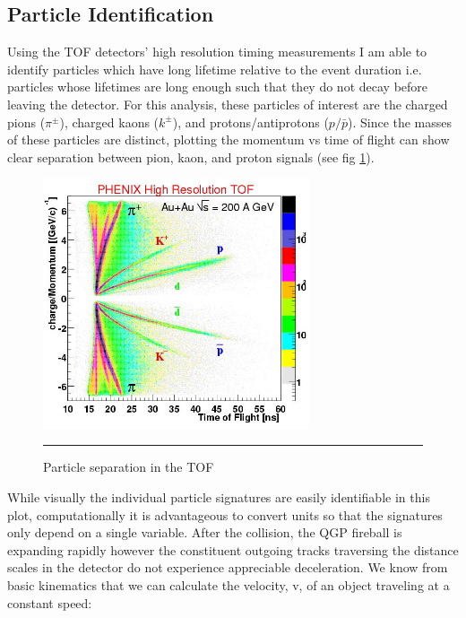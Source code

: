 \subsection{Particle Identification}
\label{sect:pidmethod}
Using the TOF detectors' high resolution timing measurements I am able to identify particles which have long lifetime relative to the event duration i.e. particles whose lifetimes are long enough such that they do not decay before leaving the detector. For this analysis, these particles of interest are the charged pions ($\pi^{\pm}$), charged kaons ($k^{\pm}$), and protons/antiprotons ($p/\bar{p}$). Since the masses of these particles are distinct, plotting the momentum vs time of flight can show clear separation between pion, kaon, and proton signals (see fig \ref{fig:tofchargemom}). 

\begin{figure}[htbp!]
  \centering
    \includegraphics[width=0.7\textwidth]{Figures/tofchargemom.JPG}
    \rule{35em}{0.5pt}
  \caption[Particle separation in the TOF]{Particle separation in the TOF \citep{tofchargemom}}
  \label{fig:tofchargemom}
\end{figure}

While visually the individual particle signatures are easily identifiable in this plot, computationally it is advantageous to convert units so that the signatures only depend on a single variable. After the collision, the QGP fireball is expanding rapidly however the constituent outgoing tracks traversing the distance scales in the detector do not experience appreciable deceleration. We know from basic kinematics that we can calculate the velocity, v, of an object traveling at a constant speed:

